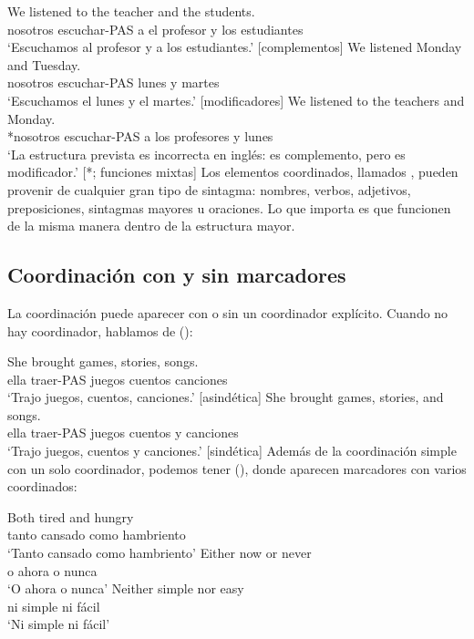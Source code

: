 \ea \label{ex:coord-function-es}
    \ea \gll We listened {\ob}to the teacher{\cb} {\ob}and the students{\cb}.\\
        nosotros escuchar-PAS a el profesor y los estudiantes\\
    \glt `Escuchamos al profesor y a los estudiantes.' [complementos]
    \ex \gll We listened {\ob}Monday{\cb} and {\ob}Tuesday{\cb}.\\
        nosotros escuchar-PAS lunes y martes\\
    \glt `Escuchamos el lunes y el martes.' [modificadores]
    \ex \gll *We listened {\ob}to the teachers{\cb} and {\ob}Monday{\cb}.\\
        *nosotros escuchar-PAS a los profesores y lunes\\
    \glt `La estructura prevista es incorrecta en inglés:  es complemento, pero  es modificador.' [*; funciones mixtas]
    \z
\z
Los elementos coordinados, llamados , pueden provenir de cualquier gran tipo de sintagma: nombres, verbos, adjetivos, preposiciones, sintagmas mayores u oraciones. Lo que importa es que funcionen de la misma manera dentro de la estructura mayor.

\subsection{Coordinación con y sin marcadores}

La coordinación puede aparecer con o sin un coordinador explícito. Cuando no hay coordinador, hablamos de  ():

\ea \label{ex:coord-marking-es}
    \ea \gll She brought {\ob}games{\cb}, {\ob}stories{\cb}, {\ob}songs{\cb}.\\
        ella traer-PAS juegos cuentos canciones\\
    \glt `Trajo juegos, cuentos, canciones.' [asindética]
    \ex \gll She brought {\ob}games{\cb}, {\ob}stories{\cb}, and {\ob}songs{\cb}.\\
        ella traer-PAS juegos cuentos y canciones\\
    \glt `Trajo juegos, cuentos y canciones.' [sindética]
    \z
\z
Además de la coordinación simple con un solo coordinador, podemos tener  (), donde aparecen marcadores con varios coordinados:

\ea \label{ex:coord-correlative-es}
    \ea \gll {\ob}Both{\cb} tired {\ob}and{\cb} hungry\\
        tanto cansado como hambriento\\
    \glt `Tanto cansado como hambriento'
    \ex \gll {\ob}Either{\cb} now {\ob}or{\cb} never\\
        o ahora o nunca\\
    \glt `O ahora o nunca'
    \ex \gll {\ob}Neither{\cb} simple {\ob}nor{\cb} easy\\
        ni simple ni fácil\\
    \glt `Ni simple ni fácil'
    \z
\z

